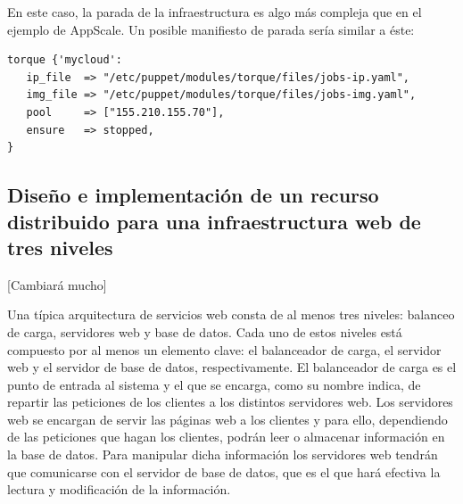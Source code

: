 En este caso, la parada de la infraestructura es algo más compleja que en el ejemplo de AppScale. Un posible manifiesto de parada sería similar a éste:

\begin{lstlisting}
torque {'mycloud':
   ip_file  => "/etc/puppet/modules/torque/files/jobs-ip.yaml",
   img_file => "/etc/puppet/modules/torque/files/jobs-img.yaml",
   pool     => ["155.210.155.70"],
   ensure   => stopped,
}
\end{lstlisting}






\subsection{Diseño e implementación de un recurso distribuido para una infraestructura web de tres niveles}

[Cambiará mucho]

Una típica arquitectura de servicios web consta de al menos tres niveles: balanceo de carga, servidores web y base de datos. Cada uno de estos niveles está compuesto por al menos un elemento clave: el balanceador de carga, el servidor web y el servidor de base de datos, respectivamente. El balanceador de carga es el punto de entrada al sistema y el que se encarga, como su nombre indica, de repartir las peticiones de los clientes a los distintos servidores web. Los servidores web se encargan de servir las páginas web a los clientes y para ello, dependiendo de las peticiones que hagan los clientes, podrán leer o almacenar información en la base de datos. Para manipular dicha información los servidores web tendrán que comunicarse con el servidor de base de datos, que es el que hará efectiva la lectura y modificación de la información.\\

